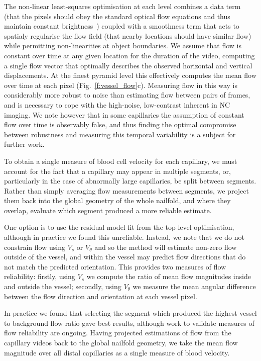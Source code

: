 \documentclass[runningheads,a4paper]{llncs}
\newcommand{\fref}[1]{Fig.~\ref{#1}}
\newcommand{\sref}[1]{Section~\ref{#1}}
\def\eg{e.g.}
\begin{document}
The non-linear least-squares optimisation at each level combines a data term (that the pixels should obey the standard optical flow equations and thus maintain constant brightness~\cite{Horn_Schunk_AI81}) coupled with a smoothness term that acts to spatialy regularise the flow field (that nearby locations should have similar flow) while permitting non-linearities at object boundaries. We assume that flow is constant over time at any given location for the duration of the video, computing a single flow vector that optimally describes the observed horizontal and vertical displacements. At the finest pyramid level this effectively computes the mean flow over time at each pixel (\fref{f:vessel_flow}c). Measuring flow in this way is considerably more robust to noise than estimating flow between pairs of frames, and is necessary to cope with the high-noise, low-contrast inherent in NC imaging. We note however that in some capillaries the assumption of constant flow over time is observably false, and thus finding the optimal compromise between robustness and measuring this temporal variability is a subject for further work.

To obtain a single measure of blood cell velocity for each capillary, we must account for the fact that a capillary may appear in multiple segments, or, particularly in the case of abnormally large capillaries, be split between segments. Rather than simply averaging flow measurements between segments, we project them back into the global geometry of the whole nailfold, and where they overlap, evaluate which segment produced a more reliable estimate. 

One option is to use the residual model-fit from the top-level optimisation, although in practice we found this unreliable. Instead, we note that we do not constrain flow using $V_s$ or $V_\theta$ and so the method will estimate non-zero flow outside of the vessel, and within the vessel may predict flow directions that do not match the predicted orientation. This provides two measures of flow reliability: firstly, using $V_s$ we compute the ratio of mean flow magnitudes inside and outside the vessel; secondly, using $V_\theta$ we measure the mean angular difference between the flow direction and orientation at each vessel pixel.%

In practice we found that selecting the segment which produced the highest vessel to background flow ratio gave best results, although work to validate measures of flow reliability are ongoing. Having projected estimations of flow from the capillary videos back to the global nailfold geometry, we take the mean flow magnitude over all distal capillaries as a single measure of blood velocity. %
%
\end{document}
